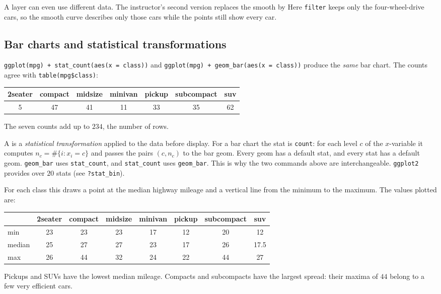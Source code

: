 A layer can even use different data. The instructor's second version replaces the smooth by
Here \texttt{filter} keeps only the four-wheel-drive cars, so the smooth curve describes only
those cars while the points still show every car.

\subsection{Bar charts and statistical transformations}
\begin{example}\label{ex:L03-count}
\texttt{ggplot(mpg) + stat\_count(aes(x = class))} and
\texttt{ggplot(mpg) + geom\_bar(aes(x = class))} produce the \emph{same} bar chart. The counts
agree with \texttt{table(mpg\$class)}:
\begin{center}
\begin{tabular}{ccccccc}\hline
2seater & compact & midsize & minivan & pickup & subcompact & suv\\\hline
5 & 47 & 41 & 11 & 33 & 35 & 62\\\hline
\end{tabular}
\end{center}
The seven counts add up to $234$, the number of rows.
\end{example}

\begin{definition}[Stat]\label{def:L03-stat}
A  is a \emph{statistical transformation} applied to the data before display. For a
bar chart the stat is \texttt{count}: for each level $c$ of the $x$-variable it computes
$n_c=\#\{i: x_i=c\}$ and passes the pairs $(c,n_c)$ to the bar geom. Every geom has a default
stat, and every stat has a default geom. \texttt{geom\_bar} uses \texttt{stat\_count}, and
\texttt{stat\_count} uses \texttt{geom\_bar}. This is why the two commands above are
interchangeable. \texttt{ggplot2} provides over $20$ stats (see \texttt{?stat\_bin}).
\end{definition}

\begin{example}\label{ex:L03-summary}
For each class this draws a point at the median highway mileage and a vertical line from the
minimum to the maximum. The values plotted are:
\begin{center}
\begin{tabular}{lccccccc}\hline
 & 2seater & compact & midsize & minivan & pickup & subcompact & suv\\\hline
min & 23 & 23 & 23 & 17 & 12 & 20 & 12\\
median & 25 & 27 & 27 & 23 & 17 & 26 & 17.5\\
max & 26 & 44 & 32 & 24 & 22 & 44 & 27\\\hline
\end{tabular}
\end{center}
Pickups and SUVs have the lowest median mileage. Compacts and subcompacts have the largest
spread: their maxima of $44$ belong to a few very efficient cars.
\end{example}

